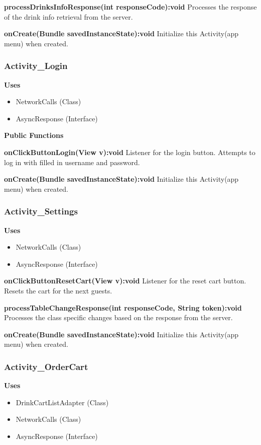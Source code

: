 \documentclass [10pt]{article}
\begin{document}
\textbf{processDrinksInfoResponse(int responseCode):void}
Processes the response of the drink info retrieval from the server.

\textbf{onCreate(Bundle savedInstanceState):void}
Initialize this Activity(app menu) when created.

\subsubsection{Activity\_Login}

\textbf{Uses}
\begin{itemize}
	\item NetworkCalls (Class)
	\item AsyncResponse (Interface)
\end{itemize}

\textbf{Public Functions}

\textbf{onClickButtonLogin(View v):void}
Listener for the login button. Attempts to log in with filled in username and password.

\textbf{onCreate(Bundle savedInstanceState):void}
Initialize this Activity(app menu) when created.

\subsubsection{Activity\_Settings}

\textbf{Uses}
\begin{itemize}
	\item NetworkCalls (Class)
	\item AsyncResponse (Interface)
\end{itemize}

\textbf{onClickButtonResetCart(View v):void}
Listener for the reset cart button. Resets the cart for the next guests.

\textbf{processTableChangeResponse(int responseCode, String token):void}
Processes the class specific changes based on the response from the server.

\textbf{onCreate(Bundle savedInstanceState):void}
Initialize this Activity(app menu) when created.

\subsubsection{Activity\_OrderCart}

\textbf{Uses}
\begin{itemize}
	\item DrinkCartListAdapter (Class)
	\item NetworkCalls (Class)
	\item AsyncResponse (Interface)
\end{itemize}
\end{document}
